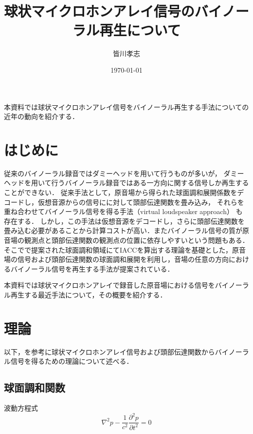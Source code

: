 \documentclass[a4paper]{jsarticle}
\begin{document}
\title{球状マイクロホンアレイ信号のバイノーラル再生について}
\author{皆川孝志}
\date{\today}
\maketitle

本資料では球状マイクロホンアレイ信号をバイノーラル再生する手法についての近年の動向を紹介する．

\section{はじめに}
従来のバイノーラル録音ではダミーヘッドを用いて行うものが多いが，
ダミーヘッドを用いて行うバイノーラル録音ではある一方向に関する信号しか再生することができない\cite{Andersson_undated-qg}．
従来手法として，原音場から得られた球面調和展開係数をデコードし，仮想音源からの信号にに対して頭部伝達関数を畳み込み，
それらを重ね合わせてバイノーラル信号を得る手法\cite{Jot1999-bt, Noisternig2003-ug}（virtual loudspeaker approach）
も存在する．
しかし，この手法は仮想音源をデコードし，さらに頭部伝達関数を畳み込む必要があることから計算コストが高い．またバイノーラル信号の質が原音場の観測点と頭部伝達関数の観測点の位置に依存しやすいという問題もある．
そこで\cite{Rafaely2010-ea}で提案された球面調和領域にてIACCを算出する理論を基礎とした，原音場の信号および頭部伝達関数の球面調和展開を利用し，音場の任意の方向におけるバイノーラル信号を再生する手法が提案されている\cite{Andersson_undated-qg, Ben-Hur2017-gm, Bernschutz2016-be,Otani2020-cg,Schorkhuber2018-ql, Sheaffer2014-bo, Zaunschirm2018-mn}．

本資料では球状マイクロホンアレイで録音した原音場における信号をバイノーラル再生する最近手法について，その概要を紹介する．

\section{理論}
以下，\cite{Andersson_undated-qg}を参考に球状マイクロホンアレイ信号および頭部伝達関数からバイノーラル信号を得るための理論について述べる．

\subsection{球面調和関数}
波動方程式
\begin{equation}
    \label{wave-equation}
    \nabla^{2} p-\frac{1}{c^{2}} \frac{\partial^{2} p}{\partial t^{2}}=0
\end{equation}
\end{document}

